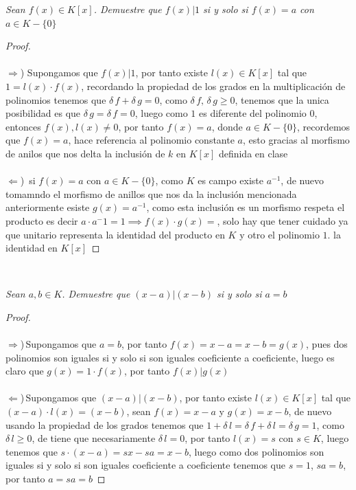\documentclass[11pt,letterpaper]{article}
\begin{document}
\begin{tcolorbox}[
	title = \textcolor{black}{\textcolor{white}{Problema 4}},]
\textit{Sean $f(x)\in K[x]$. Demuestre que $f(x)|1$ si y solo si $f(x)=a$ con $a\in K-\{0\}$
}
\end{tcolorbox}
\begin{proof}\,\\
    \,\\
    $\Rightarrow$) Supongamos que $f(x)|1$, por tanto existe $l(x)\in K[x]$ tal que $1=l(x)\cdot f(x)$, recordando
    la propiedad de los grados en la multiplicaci\'on de polinomios tenemos que $\delta\,f+\delta\,g=0$, como $\delta\,f,\,\delta\,g\geq 0$,
    tenemos que la unica posibilidad es que $\delta\,g=\delta\,f=0$, luego como $1$ es diferente del polinomio $0$, entonces $f(x),l(x)\neq 0$,
    por tanto $f(x)=a$, donde $a\in K-\{0\}$, recordemos que $f(x)=a$, hace referencia al polinomio constante $a$, esto gracias al morfismo de anilos que nos delta
    la inclusi\'on de $k$ en $K[x]$ definida en clase\,\\
    \,\\
    $\Leftarrow$)\, si $f(x)=a$ con $a\in K-\{0\}$, como $K$ es campo existe $a^{-1}$, de nuevo tomamndo el morfismo de anillos que nos da la inclusi\'on mencionada
    anteriormente esiste $g(x)=a^{-1}$, como esta inclusi\'on es un morfismo respeta el producto es decir $a\cdot a^-1=1\implies f(x)\cdot g(x)=$, solo hay que tener cuidado ya que unitario
    representa la identidad del producto en $K$ y otro el polinomio $1$. la identidad en $K[x]$
\end{proof}\,\\
\begin{tcolorbox}[
	title = \textcolor{black}{\textcolor{white}{Problema 5}},]
\textit{Sean $a,b\in K $. Demuestre que $(x-a)|(x-b) $ si y solo si $a=b$
}
\end{tcolorbox}
\begin{proof}\,\\
    \,\\
$\Rightarrow$)\,Supongamos que $a=b$, por tanto $f(x)=x-a=x-b=g(x)$, pues dos polinomios son iguales si y solo si son iguales coeficiente a coeficiente, luego
es claro que $g(x)=1\cdot f(x)$, por tanto $f(x)|g(x)$\,\\
\,\\
$\Leftarrow$)\,Supongamos que $(x-a)|(x-b)$, por tanto existe $l(x)\in K[x]$ tal que $(x-a)\cdot l(x)=(x-b)$, sean $f(x)=x-a$ y $g(x)=x-b$, de nuevo
usando la propiedad de los grados tenemos que $1+\delta\,l=\delta\,f+\delta\,l=\delta\,g=1$, como $\delta\,l\geq 0$, de tiene que necesariamente $\delta\,l=0$, por tanto
$l(x)=s$ con $s\in K$, luego tenemos que $s\cdot(x-a)=sx-sa=x-b$, luego como dos polinomios son iguales si y solo si son iguales coeficiente a coeficiente tenemos que
$s=1$, $sa=b$, por tanto $a=sa=b$ 
\end{proof}\,\\
\end{document}
